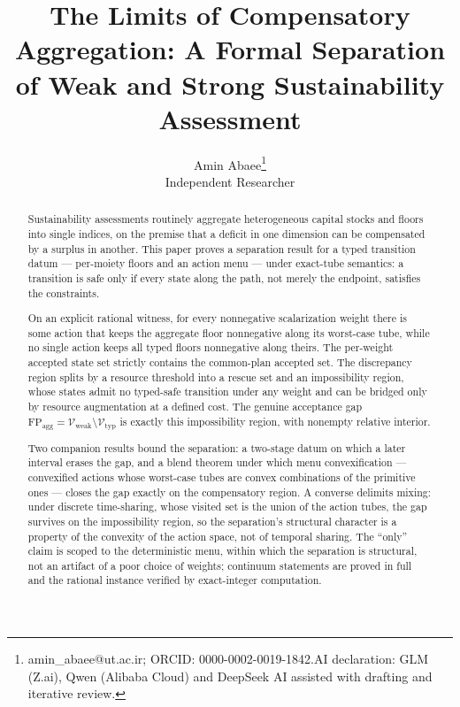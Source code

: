 \documentclass[11pt]{article}
\begin{document}
\title{The Limits of Compensatory Aggregation: A Formal Separation of Weak and Strong Sustainability Assessment}
\author{Amin Abaee\thanks{amin\_abaee@ut.ac.ir; ORCID: 0000-0002-0019-1842.\newline AI declaration: GLM (Z.ai), Qwen (Alibaba Cloud) and DeepSeek AI assisted with drafting and iterative review.} \\ Independent Researcher}
\date{}
\maketitle

\begin{abstract}


Sustainability assessments routinely aggregate heterogeneous capital
stocks and floors into single indices, on the premise that a deficit in
one dimension can be compensated by a surplus in another. This paper
proves a separation result for a typed transition datum --- per-moiety
floors and an action menu --- under exact-tube semantics: a transition
is safe only if every state along the path, not merely the endpoint,
satisfies the constraints.

On an explicit rational witness, for every nonnegative scalarization
weight there is some action that keeps the aggregate floor nonnegative
along its worst-case tube, while no single action keeps all typed floors
nonnegative along theirs. The per-weight accepted state set strictly
contains the common-plan accepted set. The discrepancy region splits by
a resource threshold into a rescue set and an impossibility region,
whose states admit no typed-safe transition under any weight and can be
bridged only by resource augmentation at a defined cost. The genuine
acceptance gap
\(\mathrm{FP}_{\mathrm{agg}} = \mathcal{V}_{\mathrm{weak}} \setminus \mathcal{V}_{\mathrm{typ}}\)
is exactly this impossibility region, with nonempty relative interior.

Two companion results bound the separation: a two-stage datum on which a
later interval erases the gap, and a blend theorem under which menu
convexification --- convexified actions whose worst-case tubes are
convex combinations of the primitive ones --- closes the gap exactly on
the compensatory region. A converse delimits mixing: under discrete
time-sharing, whose visited set is the union of the action tubes, the
gap survives on the impossibility region, so the separation's structural
character is a property of the convexity of the action space, not of
temporal sharing. The ``only'' claim is scoped to the deterministic
menu, within which the separation is structural, not an artifact of a
poor choice of weights; continuum statements are proved in full and the
rational instance verified by exact-integer computation.

\end{abstract}
\end{document}
